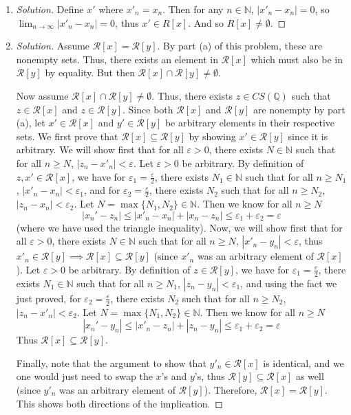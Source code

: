 \documentclass{article}
\newcommand{\N}{{\mathbb N}}
\newcommand{\Q}{{\mathbb Q}}
\newcommand{\ep}{{\varepsilon}}
\newcommand{\SR}{{\mathcal R}}
\begin{document}
\begin{enumerate}
	\item \begin{proof}[Solution]\let\qed\relax
		Define $x'$ where $x'_n = x_n$.
		Then for any $n \in \N$, $|x'_n - x_n| = 0$,
		so $\lim_{n\to\infty}|x'_n - x_n| = 0$,
		thus $x' \in R[x]$.
		And so $R[x] \neq \emptyset$.
	\end{proof}
	\item \begin{proof}[Solution]\let\qed\relax
		Assume $\SR[x] = \SR[y]$.
		By part (a) of this problem, these are nonempty sets.
		Thus, there exists an element in $\SR[x]$ which must also be in
		$\SR[y]$ by equality.
		But then $\SR[x] \cap \SR[y] \neq \emptyset$.

		Now assume $\SR[x] \cap \SR[y] \neq \emptyset$.
		Thus, there exists $z \in CS(\Q)$ such that
		$z \in \SR[x]$ and $z \in \SR[y]$.
		Since both $\SR[x]$ and $\SR[y]$ are nonempty by part (a),
		let $x' \in \SR[x]$ and $y'\in\SR[y]$ be arbitrary elements in
		their respective sets.
		We first prove that $\SR[x] \subseteq \SR[y]$
		by showing $x' \in \SR[y]$ since it is arbitrary.
		We will show first that for all $\ep > 0$,
		there exists $N \in \N$ such that for all $n \geq N$, $|z_n - x'_n| < \ep$.
		Let $\ep > 0$ be arbitrary.
		By definition of $z,x' \in \SR[x]$,
		we have for $\ep_1 = \frac{\ep}{2}$,
		there exists $N_1 \in \N$ such that for all
		$n \geq N_1$, $|x'_n - x_n| < \ep_1$,
		and for $\ep_2 = \frac{\ep}{2}$,
		there exists $N_2$ such that for all
		$n \geq N_2$, $|z_n - x_n| < \ep_2$.
		Let $N = \max\{N_1,N_2\} \in \N$.
		Then we know for all $n \geq N$
		\[
			|x_n' - z_n| \leq |x'_n - x_n| + |x_n - z_n| \leq \ep_1 + \ep_2 = \ep
		\]
		(where we have used the triangle inequality).
		Now, we will show first that for all $\ep > 0$,
		there exists $N \in \N$ such that for all $n \geq N$, $|x'_n - y_n| < \ep$,
		thus $x'_n \in \SR[y] \implies \SR[x] \subseteq \SR[y]$
		(since $x'_n$ was an arbitrary element of $\SR[x]$).
		Let $\ep > 0$ be arbitrary.
		By definition of $z \in \SR[y]$,
		we have for $\ep_1 = \frac{\ep}{2}$,
		there exists $N_1 \in \N$ such that for all
		$n \geq N_1$, $|z_n - y_n| < \ep_1$,
		and using the fact we just proved,
		for $\ep_2 = \frac{\ep}{2}$,
		there exists $N_2$ such that for all
		$n \geq N_2$, $|z_n - x'_n| < \ep_2$.
		Let $N = \max\{N_1,N_2\} \in \N$.
		Then we know for all $n \geq N$
		\[
			|x_n' - y_n| \leq |x'_n - z_n| + |z_n - y_n| \leq \ep_1 + \ep_2 = \ep
		\]
		Thus $\SR[x] \subseteq \SR[y]$.

		Finally, note that the argument to show that
		$y'_n \in \SR[x]$ is identical,
		and we one would just need to swap the $x$'s and $y$'s,
		thus $\SR[y] \subseteq \SR[x]$ as well
		(since $y'_n$ was an arbitrary element of $\SR[y]$).
		Therefore, $\SR[x] = \SR[y]$.
		This shows both directions of the implication.
	\end{proof}
\end{enumerate}
\clearpage
~\clearpage
\end{document}
